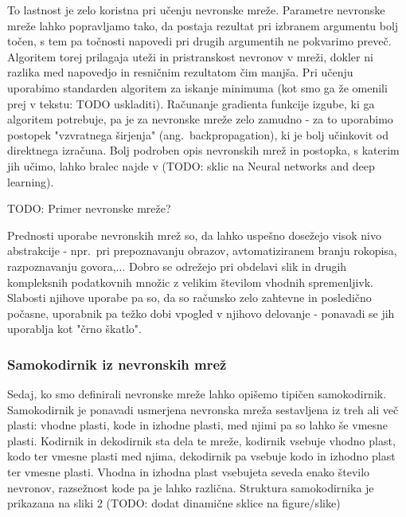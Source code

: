 \documentclass[12pt,a4paper]{article}
\begin{document}
To lastnost je zelo koristna pri učenju nevronske mreže. Parametre nevronske mreže lahko popravljamo tako, da postaja rezultat pri izbranem argumentu bolj točen, s tem pa točnosti napovedi pri drugih argumentih ne pokvarimo preveč. Algoritem torej prilagaja uteži in pristranskost nevronov v mreži, dokler ni razlika med napovedjo in resničnim rezultatom čim manjša. Pri učenju uporabimo standarden algoritem za iskanje minimuma (kot smo ga že omenili prej v tekstu: TODO uskladiti). Računanje gradienta funkcije izgube, ki ga algoritem potrebuje, pa je za nevronske mreže zelo zamudno - za to uporabimo postopek "vzvratnega širjenja" (ang.~backpropagation), ki je bolj učinkovit od direktnega izračuna. Bolj podroben opis nevronskih mrež in postopka, s katerim jih učimo, lahko bralec najde v (TODO: sklic na Neural networks and deep learning).

TODO: Primer nevronske mreže?

Prednosti uporabe nevronskih mrež so, da lahko uspešno dosežejo visok nivo abstrakcije - npr.\ pri prepoznavanju obrazov, avtomatiziranem branju rokopisa, razpoznavanju govora,... 
Dobro se odrežejo pri obdelavi slik in drugih kompleksnih podatkovnih množic z velikim številom vhodnih spremenljivk. 
Slabosti njihove uporabe pa so, da so računsko zelo zahtevne in posledično počasne, uporabnik pa težko dobi vpogled v njihovo delovanje - ponavadi se jih uporablja kot "črno škatlo".



\subsubsection{Samokodirnik iz nevronskih mrež}


Sedaj, ko smo definirali nevronske mreže lahko opišemo tipičen samokodirnik. 
Samokodirnik je ponavadi usmerjena nevronska mreža sestavljena iz treh ali več plasti: vhodne plasti, kode in izhodne plasti, med njimi pa so lahko še vmesne plasti. 
Kodirnik in dekodirnik sta dela te mreže, kodirnik vsebuje vhodno plast, kodo ter vmesne plasti med njima, dekodirnik pa vsebuje kodo in izhodno plast ter vmesne plasti. 
Vhodna in izhodna plast vsebujeta seveda enako število nevronov, razsežnost kode pa je lahko različna. 
Struktura samokodirnika je prikazana na sliki 2 (TODO: dodat dinamične sklice na figure/slike)
\end{document}
